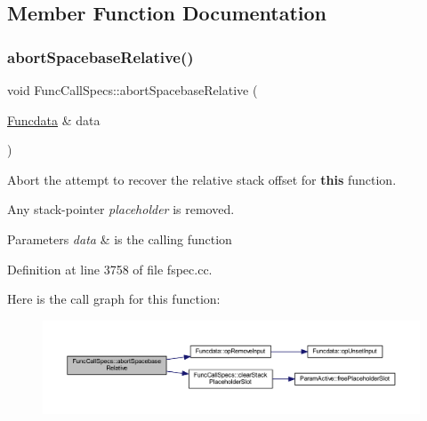 \subsection{Member Function Documentation}
\mbox{\label{class_func_call_specs_ad3c3231b5c523e491d65f31ddb688cc1}} 
\subsubsection{\texorpdfstring{abortSpacebaseRelative()}{abortSpacebaseRelative()}}
{\footnotesize\ttfamily void Func\+Call\+Specs\+::abort\+Spacebase\+Relative (\begin{DoxyParamCaption}\item[{\mbox{\hyperlink{class_funcdata}{Funcdata}} \&}]{data }\end{DoxyParamCaption})}



Abort the attempt to recover the relative stack offset for {\bfseries{this}} function. 

Any stack-\/pointer {\itshape placeholder} is removed. 
\begin{DoxyParams}{Parameters}
{\em data} & is the calling function \\
\hline
\end{DoxyParams}


Definition at line 3758 of file fspec.\+cc.

Here is the call graph for this function\+:
\nopagebreak
\begin{figure}[H]
\begin{center}
\leavevmode
\includegraphics[width=350pt]{class_func_call_specs_ad3c3231b5c523e491d65f31ddb688cc1_cgraph}
\end{center}
\end{figure}
\mbox{\label{class_func_call_specs_a1bb49b65cf036e8bc8b398e549b26a9c}} 
